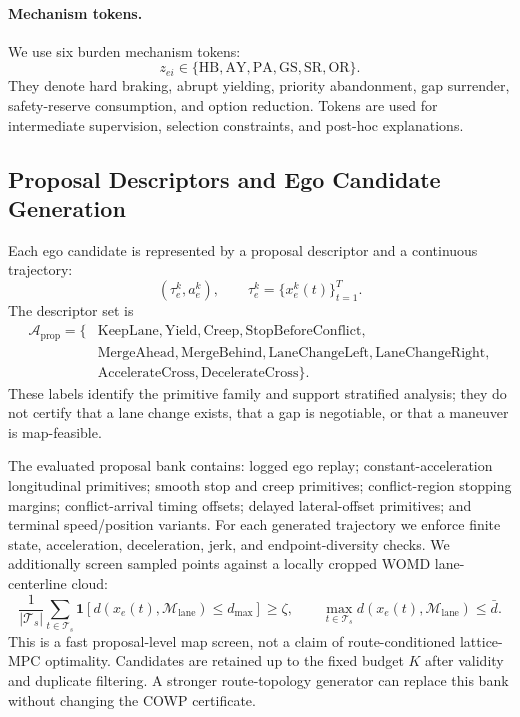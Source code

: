 \documentclass[10pt]{article}
\begin{document}
\paragraph{Mechanism tokens.}
We use six burden mechanism tokens:
\begin{equation}
    z_{ei}\in
    \{
    \mathrm{HB},
    \mathrm{AY},
    \mathrm{PA},
    \mathrm{GS},
    \mathrm{SR},
    \mathrm{OR}
    \}.
\end{equation}
They denote hard braking, abrupt yielding, priority abandonment, gap surrender, safety-reserve consumption, and option reduction. Tokens are used for intermediate supervision, selection constraints, and post-hoc explanations.

\subsection{Proposal Descriptors and Ego Candidate Generation}
\label{app:ego_candidates}

Each ego candidate is represented by a proposal descriptor and a continuous trajectory:
\begin{equation}
    (\tau^k_e,a^k_e), \qquad
    \tau^k_e=\{x^k_e(t)\}_{t=1}^{T}.
\end{equation}
The descriptor set is
\begin{equation}
\begin{aligned}
    \mathcal{A}_{\mathrm{prop}}
    =
    \{
    &\mathrm{KeepLane},
    \mathrm{Yield},
    \mathrm{Creep},
    \mathrm{StopBeforeConflict},\\
    &\mathrm{MergeAhead},
    \mathrm{MergeBehind},
    \mathrm{LaneChangeLeft},
    \mathrm{LaneChangeRight},\\
    &\mathrm{AccelerateCross},
    \mathrm{DecelerateCross}
    \}.
\end{aligned}
\end{equation}
These labels identify the primitive family and support stratified analysis; they do not certify that a lane change exists, that a gap is negotiable, or that a maneuver is map-feasible.

The evaluated proposal bank contains: logged ego replay; constant-acceleration longitudinal primitives; smooth stop and creep primitives; conflict-region stopping margins; conflict-arrival timing offsets; delayed lateral-offset primitives; and terminal speed/position variants. For each generated trajectory we enforce finite state, acceleration, deceleration, jerk, and endpoint-diversity checks. We additionally screen sampled points against a locally cropped WOMD lane-centerline cloud:
\begin{equation}
    \frac{1}{|\mathcal T_s|}
    \sum_{t\in\mathcal T_s}
    \mathbf 1[d(x_e(t),\mathcal M_{\mathrm{lane}})\le d_{\max}]
    \ge \zeta,
    \qquad
    \max_{t\in\mathcal T_s}d(x_e(t),\mathcal M_{\mathrm{lane}})\le \bar d.
\end{equation}
This is a fast proposal-level map screen, not a claim of route-conditioned lattice-MPC optimality. Candidates are retained up to the fixed budget $K$ after validity and duplicate filtering. A stronger route-topology generator can replace this bank without changing the COWP certificate.
\end{document}
